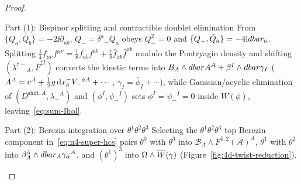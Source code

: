 \begin{proof}\leavevmode
\begin{proofpart}{Part (1): Bispinor splitting and contractible doublet elimination}
From $\{Q_a,\bar{Q}_{\dot{b}}\} = -2\ii\partial_{a\dot{b}}$, $Q_- = \delta^a{}_- Q_a$ obeys $Q_-^2 = 0$ and $\{Q_-,\bar{Q}_{\dot{a}}\} = -4\mathrm{i}dbar_{\dot{a}}$. Splitting $\frac{1}{4}f_{\mu\nu}f^{\mu\nu} = \frac{1}{8}f_{ab}f^{ab} + \frac{1}{8}\bar{f}_{\dot{a}\dot{b}}\bar{f}^{\dot{a}\dot{b}}$ modulo the Pontryagin density and shifting $(\lambda^{\ddagger -}{}_A, \bar{F}^{\ddagger I})$ converts the kinetic terms into $B_A\wedge dbarA^A + \beta^I\wedge dbar\gamma_I$ ($A^A = c^A + \frac{1}{2}g\,\mathrm{d} x^-_{\dot{a}}V_-{}^{\dot{a}A} + \cdots$, $\gamma_I = \bar{\phi}_I + \cdots$), while Gaussian/acyclic elimination of $(D^{\mathrm{shift},A},\lambda_-{}^A)$ and $(\phi^I,\psi_-{}^I)$ sets $\phi^I = \psi_-{}^I = 0$ inside $W(\phi)$, leaving~\eqref{eq:sum-Ihol}.
\end{proofpart}
\begin{proofpart}{Part (2): Berezin integration over $\theta^1\theta^2\theta^3$}
Selecting the $\theta^1\theta^2\theta^3$ top Berezin component in~\eqref{eq:n4-super-hcs} pairs $\theta^0$ with $\theta^3$ into $\mathcal{B}_A\wedge F^{0,2}(\mathcal{A})^A$, $\theta^1$ with $\theta^2$ into $\beta^{\hat{\alpha}}_A\wedge dbar_{A}\gamma_{\hat{\alpha}}{}^A$, and $(\theta^1)^3$ into $\Omega\wedge\overline{W}(\gamma)$ (Figure~\ref{fig:4d-twist-reduction}).
\end{proofpart}
\end{proof}

